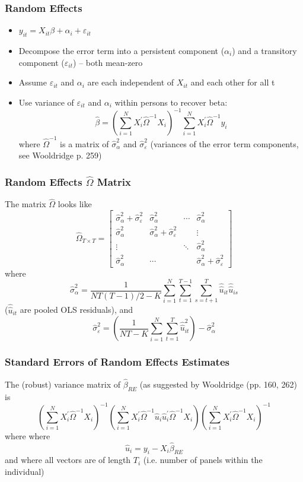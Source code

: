 \documentclass[english,xcolor=dvipsnames]{beamer}
\newcommand{\bi}{\begin{itemize}}
\newcommand{\ei}{\end{itemize}}
\begin{document}
\begin{frame}
\frametitle{Random Effects}
   \bi 
   \item $y_{it} = X_{it}\beta + \alpha_{i}+ \varepsilon_{it}$
   \item Decompose the error term into a persistent component ($\alpha_{i}$) and a transitory component ($\varepsilon_{it}$) -- both mean-zero
   \item Assume $\varepsilon_{it}$ and $\alpha_{i}$ are each independent of $X_{it}$ and each other for all t
   \item Use variance of $\varepsilon_{it}$ and $\alpha_{i}$ within persons to recover beta:
   \[ \hat{\beta} = \left(\sum_{i=1}^{N} X_{i}^{\prime} \hat{\Omega}^{-1} X_{i}\right)^{-1} \sum_{i=1}^{N}X_{i}^{\prime} \hat{\Omega}^{-1} y_{i}\] where $ \hat{\Omega}^{-1} $ is a matrix of $\hat{\sigma}_{\alpha}^{2}$ and $\hat{\sigma}_{\varepsilon}^{2}$ (variances of the error term components, see Wooldridge p. 259)
   \ei
\end{frame}

\begin{frame}
\frametitle{Random Effects $\hat{\Omega}$ Matrix}
The matrix $\hat{\Omega}$ looks like
\[
\hat{\Omega}_{T \times T}=\left[\begin{array}{cccc}
\hat{\sigma}_{\alpha}^{2}+\hat{\sigma}_{\varepsilon}^{2} & \hat{\sigma}_{\alpha}^{2} & \cdots & \hat{\sigma}_{\alpha}^{2}\\
\hat{\sigma}_{\alpha}^{2} & \hat{\sigma}_{\alpha}^{2}+\hat{\sigma}_{\varepsilon}^{2} &  & \vdots\\
\vdots &  & \ddots & \hat{\sigma}_{\alpha}^{2}\\
\hat{\sigma}_{\alpha}^{2} & \cdots &  & \hat{\sigma}_{\alpha}^{2}+\hat{\sigma}_{\varepsilon}^{2}
\end{array}\right]
\]
where
\[
\hat{\sigma}_{\alpha}^{2}=\frac{1}{NT(T-1)/2-K}\sum_{i=1}^{N}\sum_{t=1}^{T-1}\sum_{s=t+1}^{T}\hat{\hat{u}}_{it}\hat{\hat{u}}_{is}
\]
($\hat{\hat{u}}_{it}$ are pooled OLS residuals), and
\[
\hat{\sigma}_{\varepsilon}^{2}=\left(\frac{1}{NT-K}\sum_{i=1}^{N}\sum_{t=1}^{T}\hat{\hat{u}}_{it}^{2}\right)-\hat{\sigma}_{\alpha}^{2}
\]
\end{frame}

\begin{frame}
\frametitle{Standard Errors of Random Effects Estimates}
The (robust) variance matrix of $\hat{\beta}_{RE}$ (as suggested by Wooldridge (pp. 160, 262) is 
\[
\left(\sum_{i=1}^{N}X_{i}^{\prime}\hat{\Omega}^{-1}X_{i}\right)^{-1}\left(\sum_{i=1}^{N}X_{i}^{\prime}\hat{\Omega}^{-1}\hat{u}_{i}\hat{u}_{i}^{\prime}\hat{\Omega}^{-1}X_{i}\right)\left(\sum_{i=1}^{N}X_{i}^{\prime}\hat{\Omega}^{-1}X_{i}\right)^{-1}
\]
where
where
\[
\hat{u}_{i}=y_{i}-X_{i}\hat{\beta}_{RE}
\]
and where all vectors are of length $T_{i}$ (i.e. number of panels within the individual)
\end{frame}
\end{document}
